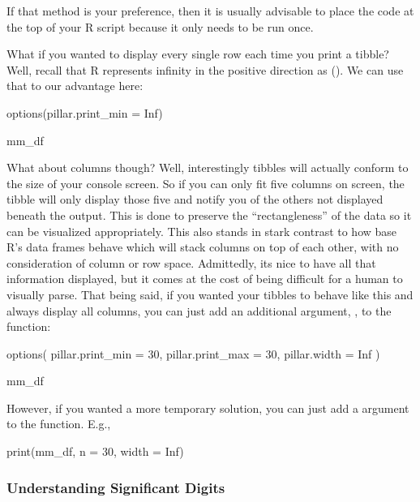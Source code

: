 \vspace{1em}

\noindent
If that method is your preference, then it is usually advisable to place the  code at the top of your R script because it only needs to be run once.

What if you wanted to display every single row each time you print a tibble? Well, recall that R represents infinity in the positive direction as (). We can use that to our advantage here:

\begin{inR}
options(pillar.print_min = Inf)

mm_df
\end{inR}

\vspace{1em}

What about columns though? Well, interestingly tibbles will actually conform to the size of your console screen.  So if you can only fit five columns on screen, the tibble will only display those five and notify you of the others not displayed beneath the output. This is done to preserve the ``rectangleness'' of the data so it can be visualized appropriately. This also stands in stark contrast to how base R's data frames behave which will stack columns on top of each other, with no consideration of column or row space. Admittedly, its nice to have all that information displayed, but it comes at the cost of being difficult for a human to visually parse. That being said, if you wanted your tibbles to behave like this and always display all columns, you can just add an additional argument, , to the  function:

\begin{inR}
options(
  pillar.print_min = 30,
  pillar.print_max = 30,
  pillar.width = Inf
)

mm_df
\end{inR}

\vspace{1em}

\noindent
However, if you wanted a more temporary solution, you can just add a  argument to the  function. E.g., 

\begin{inR}
print(mm_df, n = 30, width = Inf)
\end{inR}

\vspace{1em}

\subsubsection{Understanding Significant Digits}
\label{sec:sig_digs}

